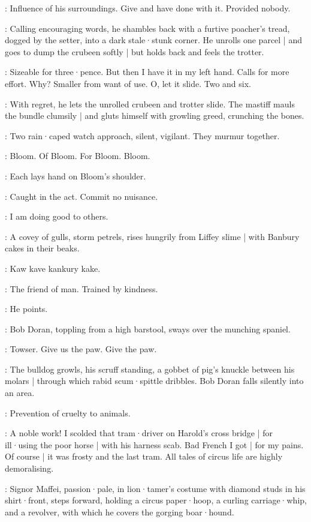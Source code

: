 \Bloom:
Influence of his surroundings.
Give and have done with it.
Provided nobody.

:
Calling encouraging words,
he shambles back with a furtive poacher's tread,
dogged by the setter,
into a dark stale·stunk corner.
He unrolls one parcel |
and goes to dump the crubeen softly |
but holds back and feels the trotter.

\Bloom:
Sizeable for three·pence.
But then I have it in my left hand.
Calls for more effort.
Why?
Smaller from want of use.
O,
let it slide.
Two and six.

:
With regret,
he lets the unrolled crubeen and trotter slide.
The mastiff mauls the bundle clumsily |
and gluts himself with growling greed,
crunching the bones.

:
Two rain·caped watch approach,
silent,
vigilant.
They murmur together.

\Watch:
Bloom.
Of Bloom.
For Bloom.
Bloom.

:
Each lays hand on Bloom's shoulder.

\FirstWatch[1]:
Caught in the act.
Commit no nuisance.

\Bloom:
I am doing good to others.

:
A covey of gulls,
storm petrels,
rises hungrily from Liffey slime |
with Banbury cakes in their beaks.

\Gulls:
Kaw kave kankury kake.

\Bloom:
The friend of man.
Trained by kindness.

:
He points.

:
Bob Doran,
toppling from a high barstool,
sways over the munching spaniel.%

\Doran:
Towser.
Give us the paw.
Give the paw.

:
The bulldog growls,
his scruff standing,
a gobbet of pig's knuckle between his molars |
through which rabid scum·spittle dribbles.
Bob Doran falls silently into an area.

\SecondWatch[2]:
Prevention of cruelty to animals.

\Bloom:
A noble work!
I scolded that tram·driver on Harold's cross bridge |
for ill·using the poor horse |
with his harness scab.
Bad French I got |
for my pains.
Of course |
it was frosty and the last tram.
All tales of circus life are highly demoralising.

:
Signor Maffei,
passion·pale,
in lion·tamer's costume with diamond studs in his shirt·front,
steps forward,
holding a circus paper·hoop,
a curling carriage·whip,
and a revolver,
with which he covers the gorging boar·hound.

